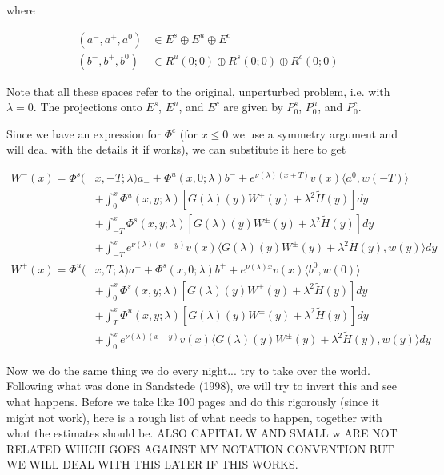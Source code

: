 \documentclass[12pt]{article}
\begin{document}
where

\begin{align*}
(a^-, a^+, a^0) &\in E^s \oplus E^u \oplus E^c \\
(b^-, b^+, b^0) &\in R^u(0; 0) \oplus R^s(0; 0) \oplus R^c(0; 0)
\end{align*}

Note that all these spaces refer to the original, unperturbed problem, i.e. with $\lambda = 0$. The projections onto $E^s$, $E^u$, and $E^c$ are given by $P_0^s$, $P_0^u$, and $P_0^c$.

Since we have an expression for $\Phi^c$ (for $x \leq 0$ we use a symmetry argument and will deal with the details it if works), we can substitute it here to get

\begin{align*}
W^-(x) = \Phi^s(&x, -T; \lambda)a_- + \Phi^u(x, 0; \lambda)b^- + e^{\nu(\lambda)(x+T)} v(x) \langle a^0, w(-T) \rangle  \\
&+ \int_0^x \Phi^u(x, y; \lambda)[ G(\lambda)(y)W^\pm(y) + \lambda^2 \tilde{H}(y) ] dy \\
&+ \int_{-T}^x \Phi^s(x, y; \lambda) [ G(\lambda)(y)W^\pm(y) + \lambda^2 \tilde{H}(y) ] dy \\
&+ \int_{-T}^x 
e^{\nu(\lambda)(x-y)} v(x) \langle G(\lambda)(y)W^\pm(y) + \lambda^2 \tilde{H}(y), w(y) \rangle dy \\
W^+(x) = \Phi^u(&x, T; \lambda)a^+ + \Phi^s(x, 0; \lambda)b^+ + e^{\nu(\lambda)x} v(x) \langle b^0, w(0) \rangle  \\
&+ \int_0^x \Phi^s(x, y; \lambda) [ G(\lambda)(y)W^\pm(y) + \lambda^2 \tilde{H}(y) ] dy \\
&+ \int_T^x \Phi^u(x, y; \lambda) [ G(\lambda)(y)W^\pm(y) + \lambda^2 \tilde{H}(y) ] dy \\
&+ \int_0^x 
e^{\nu(\lambda)(x-y)} v(x) \langle G(\lambda)(y)W^\pm(y) + \lambda^2 \tilde{H}(y), w(y) \rangle  dy
\end{align*}

Now we do the same thing we do every night... try to take over the world. Following what was done in Sandstede (1998), we will try to invert this and see what happens. Before we take like 100 pages and do this rigorously (since it might not work), here is a rough list of what needs to happen, together with what the estimates should be. ALSO CAPITAL W AND SMALL w ARE NOT RELATED WHICH GOES AGAINST MY NOTATION CONVENTION BUT WE WILL DEAL WITH THIS LATER IF THIS WORKS.
\end{document}
